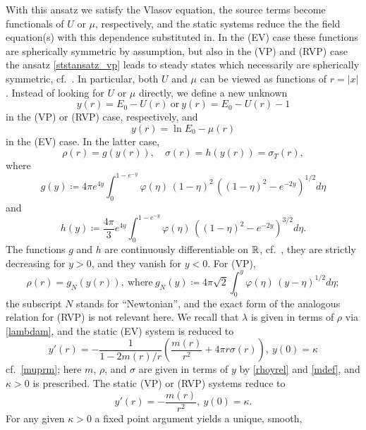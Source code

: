 \documentclass[11pt]{article}
\begin{document}
With this ansatz we satisfy the Vlasov equation,
the source terms become functionals of $U$ or $\mu$, respectively, and
the static systems reduce the the field equation(s) with this dependence
substituted in. In the (EV) case these functions are spherically symmetric
by assumption, but also in the (VP) and (RVP) case the ansatz
\eqref{ststansatz_vp} leads to steady states which necessarily are
spherically symmetric, cf.~\cite{GNN}. In particular,
both $U$ and $\mu$ can be viewed as functions of $r=|x|$.
Instead of looking for $U$ or $\mu$ directly, we
define a new unknown
\[ 
y(r) = E_0 -U(r)\ \mbox{or}\ y(r) = E_0 -U(r)-1
\]
in the (VP) or (RVP) case, respectively, and
\[ 
y(r) = \ln E_0 -\mu(r)
\]
in the (EV) case. In the latter case,
\begin{equation} \label{rhoyrel}
  \rho(r) = g(y(r)), \quad
  \sigma(r) = h(y(r)) = \sigma_T(r),
\end{equation}
where
\begin{equation} \label{gdef}
  g(y) \coloneqq 
  4 \pi e^{4 y} \int_0^{1-e^{-y}} \varphi(\eta)\, (1-\eta)^2\,
  \left((1-\eta)^2-e^{-2y}\right)^{1/2} d\eta
\end{equation}
and
\begin{equation} \label{hdef}
  h(y) \coloneqq 
  \frac{4 \pi}{3} e^{4 y} \int_0^{1-e^{-y}} \varphi(\eta)\,
  \left((1-\eta)^2-e^{-2y}\right)^{3/2} d\eta.
\end{equation}
The functions $g$ and $h$ are continuously differentiable 
on $\mathbb R$, cf.\ \cite[Lemma 2.2]{RR00}, they are strictly decreasing for $y>0$,
and they vanish for $y<0$.
For (VP),
\[ 
\rho(r) = g_N (y(r)),\ \mbox{where}\
g_N (y) \coloneqq 
4 \pi \sqrt{2} \int_0^{y} \varphi(\eta)\,
\left(y-\eta\right)^{1/2} d\eta;
\]
the subscript $N$ stands for ``Newtonian'', and the exact form of
the analogous relation for (RVP) is not relevant here. We recall that
$\lambda$ is given in terms of $\rho$ via \eqref{lambdam}, and the static
(EV) system is reduced to 
\begin{equation} \label{yeq}
  y'(r)= - \frac{1}{1-2 m(r)/r} \left(\frac{m(r)}{r^2}
  + 4 \pi r \sigma(r)\right) ,\
  y(0)=\kappa
\end{equation}
cf.~\eqref{muprm};
here $m$, $\rho$, and $\sigma$ are given in terms of $y$ by \eqref{rhoyrel}
and \eqref{mdef}, and $\kappa>0$ is prescribed.
The static (VP) or (RVP) systems reduce to
\begin{equation} \label{yeqvp}
  y'(r)= - \frac{m(r)}{r^2},\ y(0)=\kappa.
\end{equation}
For any given $\kappa >0$ a fixed point argument yields a unique, smooth,
\end{document}
